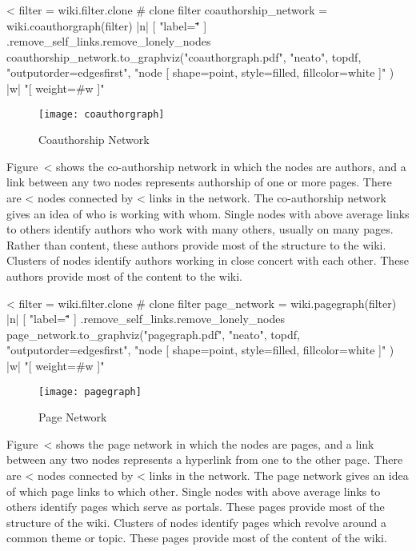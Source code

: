\documentclass{scrartcl}
\begin{document}
<%
filter = wiki.filter.clone # clone filter
coauthorship_network = wiki.coauthorgraph(filter) { |n| [ "label=\"\"" ] }.remove_self_links.remove_lonely_nodes
coauthorship_network.to_graphviz("coauthorgraph.pdf", "neato", topdf, "outputorder=edgesfirst", "node [ shape=point, style=filled, fillcolor=white ]" ) { |w|  "[ weight=#{w} ]" }
\begin{figure}[htbp]
	\centering
	\texttt{[image: coauthorgraph]}
	\caption{Coauthorship Network}
	\label{fig:coauthorship_network}
\end{figure}

Figure~<%
shows the co-authorship network in which the nodes are authors, and a link between any two nodes represents authorship of one or more pages. There are <%
nodes connected by <%
links in the network. The co-authorship network gives an idea of who is working with whom. Single nodes with above average links to others identify authors who work with many others, usually on many pages. Rather than content, these authors provide most of the structure to the wiki. Clusters of nodes identify authors working in close concert with each other. These authors provide most of the content to the wiki.

<%
filter = wiki.filter.clone # clone filter
page_network = wiki.pagegraph(filter) { |n| [ "label=\"\"" ] }.remove_self_links.remove_lonely_nodes
page_network.to_graphviz("pagegraph.pdf", "neato", topdf, "outputorder=edgesfirst", "node [ shape=point, style=filled, fillcolor=white ]" ) { |w|  "[ weight=#{w} ]" }

\begin{figure}[htbp]
	\centering
	\texttt{[image: pagegraph]}
	\caption{Page Network}
	\label{fig:page_network}
\end{figure}

Figure~<%
shows the page network in which the nodes are pages, and a link between any two nodes represents a hyperlink from one to the other page. There are <%
nodes connected by <%
links in the network.  The page network gives an idea of which page links to which other. Single nodes with above average links to others identify pages which serve as portals. These pages provide most of the structure of the wiki. Clusters of nodes identify pages which revolve around a common theme or topic. These pages provide most of the content of the wiki.
\end{document}
